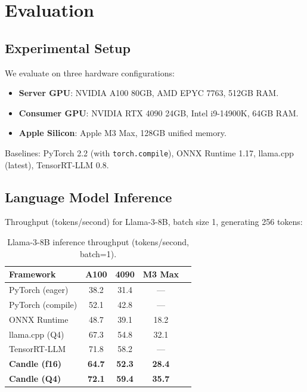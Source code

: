 \documentclass[11pt,twocolumn]{article}
\begin{document}
\section{Evaluation}
\label{sec:evaluation}

\subsection{Experimental Setup}

We evaluate on three hardware configurations:

\begin{itemize}[leftmargin=1.1em]
    \item \textbf{Server GPU}: NVIDIA A100 80GB, AMD EPYC 7763, 512GB RAM.
    \item \textbf{Consumer GPU}: NVIDIA RTX 4090 24GB, Intel i9-14900K, 64GB RAM.
    \item \textbf{Apple Silicon}: Apple M3 Max, 128GB unified memory.
\end{itemize}

Baselines: PyTorch 2.2 (with \texttt{torch.compile}), ONNX Runtime 1.17, llama.cpp (latest), TensorRT-LLM 0.8.

\subsection{Language Model Inference}

Throughput (tokens/second) for Llama-3-8B, batch size 1, generating 256 tokens:

\begin{table}[H]
\centering
\small
\begin{tabular}{lcccc}
\toprule
\textbf{Framework} & \textbf{A100} & \textbf{4090} & \textbf{M3 Max} \\
\midrule
PyTorch (eager) & 38.2 & 31.4 & --- \\
PyTorch (compile) & 52.1 & 42.8 & --- \\
ONNX Runtime & 48.7 & 39.1 & 18.2 \\
llama.cpp (Q4) & 67.3 & 54.8 & 32.1 \\
TensorRT-LLM & 71.8 & 58.2 & --- \\
\textbf{Candle (f16)} & \textbf{64.7} & \textbf{52.3} & \textbf{28.4} \\
\textbf{Candle (Q4)} & \textbf{72.1} & \textbf{59.4} & \textbf{35.7} \\
\bottomrule
\end{tabular}
\caption{Llama-3-8B inference throughput (tokens/second, batch=1).}
\label{tab:llm_bench}
\end{table}
\end{document}
